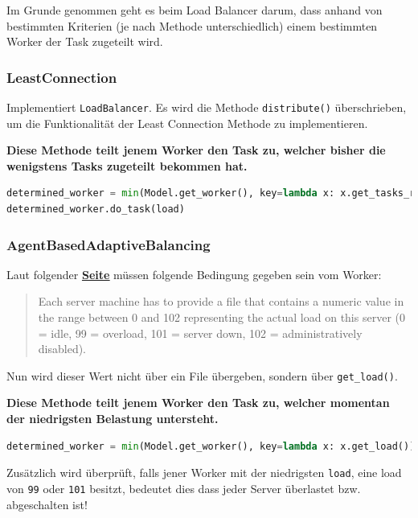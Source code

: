 Im Grunde genommen geht es beim Load Balancer darum, dass anhand von bestimmten Kriterien (je nach Methode unterschiedlich) einem bestimmten Worker der Task zugeteilt wird. 

\subsubsection{LeastConnection}
Implementiert \verb|LoadBalancer|. Es wird die Methode \verb|distribute()| überschrieben, um die Funktionalität der Least Connection Methode zu implementieren.

\textbf{Diese Methode teilt jenem Worker den Task zu, welcher bisher die wenigstens Tasks zugeteilt bekommen hat.} 

\begin{lstlisting}[language=python]
determined_worker = min(Model.get_worker(), key=lambda x: x.get_tasks_received())
determined_worker.do_task(load)
\end{lstlisting}

\subsubsection{AgentBasedAdaptiveBalancing}
Laut folgender \underline{\textbf{\href{https://support.kemptechnologies.com/hc/en-us/articles/115005405746-API-for-Agent-Based-Adaptive-Balancing}{Seite}}} müssen folgende Bedingung gegeben sein vom Worker:

\begin{quote}
	Each server machine has to provide a file that contains a numeric value in the range between 0 and 102 representing the actual load on this server (0 = idle, 99 = overload, 101 = server down, 102 = administratively disabled).
\end{quote}

Nun wird dieser Wert nicht über ein File übergeben, sondern über \verb|get_load()|.

\textbf{Diese Methode teilt jenem Worker den Task zu, welcher momentan der niedrigsten Belastung untersteht.}

\begin{lstlisting}[language=python]
determined_worker = min(Model.get_worker(), key=lambda x: x.get_load())
\end{lstlisting}

Zusätzlich wird überprüft, falls jener Worker mit der niedrigsten \verb|load|, eine load von \verb|99| oder \verb|101| besitzt, bedeutet dies dass jeder Server überlastet bzw. abgeschalten ist!

